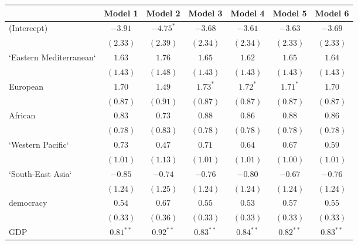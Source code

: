 
\begin{table}[!h]
\begin{center}
\begin{tabular}{l c c c c c c }
\toprule
 & Model 1 & Model 2 & Model 3 & Model 4 & Model 5 & Model 6 \\
\midrule
(Intercept)             & $-3.91$      & $-4.75^{*}$  & $-3.68$      & $-3.61$      & $-3.63$      & $-3.69$      \\
                        & $(2.33)$     & $(2.39)$     & $(2.34)$     & $(2.34)$     & $(2.33)$     & $(2.33)$     \\
`Eastern Mediterranean` & $1.63$       & $1.76$       & $1.65$       & $1.62$       & $1.65$       & $1.64$       \\
                        & $(1.43)$     & $(1.48)$     & $(1.43)$     & $(1.43)$     & $(1.43)$     & $(1.43)$     \\
European                & $1.70$       & $1.49$       & $1.73^{*}$   & $1.72^{*}$   & $1.71^{*}$   & $1.70$       \\
                        & $(0.87)$     & $(0.91)$     & $(0.87)$     & $(0.87)$     & $(0.87)$     & $(0.87)$     \\
African                 & $0.83$       & $0.73$       & $0.88$       & $0.86$       & $0.88$       & $0.86$       \\
                        & $(0.78)$     & $(0.83)$     & $(0.78)$     & $(0.78)$     & $(0.78)$     & $(0.78)$     \\
`Western Pacific`       & $0.73$       & $0.47$       & $0.71$       & $0.64$       & $0.67$       & $0.59$       \\
                        & $(1.01)$     & $(1.13)$     & $(1.01)$     & $(1.01)$     & $(1.00)$     & $(1.01)$     \\
`South-East Asia`       & $-0.85$      & $-0.74$      & $-0.76$      & $-0.80$      & $-0.67$      & $-0.76$      \\
                        & $(1.24)$     & $(1.25)$     & $(1.24)$     & $(1.24)$     & $(1.24)$     & $(1.24)$     \\
democracy               & $0.54$       & $0.67$       & $0.55$       & $0.53$       & $0.57$       & $0.55$       \\
                        & $(0.33)$     & $(0.36)$     & $(0.33)$     & $(0.33)$     & $(0.33)$     & $(0.33)$     \\
GDP                     & $0.81^{**}$  & $0.92^{**}$  & $0.83^{**}$  & $0.84^{**}$  & $0.82^{**}$  & $0.83^{**}$  \\

\end{tabular}
\end{center}
\end{table}
